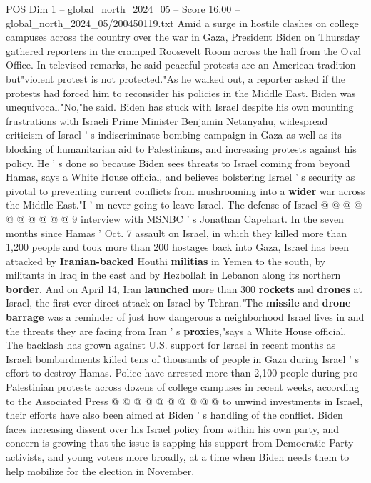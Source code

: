 \begin{textsample}{POS Dim 1 – global\_north\_2024\_05 – Score 16.00 – global\_north\_2024\_05/200450119.txt}  \label{ex:f1_pos_404}
Amid a surge in hostile clashes on college campuses across the country over the war in Gaza, President Biden on Thursday gathered reporters in the cramped Roosevelt Room across the hall from the Oval Office.
In televised remarks, he said peaceful protests are an American tradition but"violent protest is not protected."As he walked out, a reporter asked if the protests had forced him to reconsider his policies in the Middle East.
Biden was unequivocal."No,"he said.
Biden has stuck with Israel despite his own mounting frustrations with Israeli Prime Minister Benjamin Netanyahu, widespread criticism of Israel ' s indiscriminate bombing campaign in Gaza as well as its blocking of humanitarian aid to Palestinians, and increasing protests against his policy.
He ' s done so because Biden sees threats to Israel coming from beyond Hamas, says a White House official, and believes bolstering Israel ' s security as pivotal to preventing current conflicts from mushrooming into a \textbf{wider} war across the Middle East."I ' m never going to leave Israel.
The defense of Israel @ @ @ @ @ @ @ @ @ @ 9 interview with MSNBC ' s Jonathan Capehart.
In the seven months since Hamas ' Oct. 7 assault on Israel, in which they killed more than 1,200 people and took more than 200 hostages back into Gaza, Israel has been attacked by \textbf{Iranian-backed} Houthi \textbf{militias} in Yemen to the south, by militants in Iraq in the east and by Hezbollah in Lebanon along its northern \textbf{border}.
And on April 14, Iran \textbf{launched} more than 300 \textbf{rockets} and \textbf{drones} at Israel, the first ever direct attack on Israel by Tehran."The \textbf{missile} and \textbf{drone} \textbf{barrage} was a reminder of just how dangerous a neighborhood Israel lives in and the threats they are facing from Iran ' s \textbf{proxies},"says a White House official.
The backlash has grown against U.S. support for Israel in recent months as Israeli bombardments killed tens of thousands of people in Gaza during Israel ' s effort to destroy Hamas.
Police have arrested more than 2,100 people during pro-Palestinian protests across dozens of college campuses in recent weeks, according to the Associated Press @ @ @ @ @ @ @ @ @ @ to unwind investments in Israel, their efforts have also been aimed at Biden ' s handling of the conflict.
Biden faces increasing dissent over his Israel policy from within his own party, and concern is growing that the issue is sapping his support from Democratic Party activists, and young voters more broadly, at a time when Biden needs them to help mobilize for the election in November.

\end{textsample}
